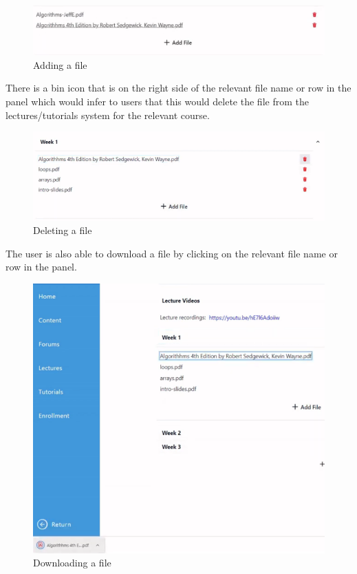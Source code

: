 \begin{figure}[h!]
    \includegraphics[scale=0.3]{images/lat-add-file.png}
    \centering
    \caption{Adding a file}
\end{figure}

There is a bin icon that is on the right side of the relevant file name or row in the panel which would infer to users that this would delete the file from the lectures/tutorials system for the relevant course.

\begin{figure}[h!]
    \includegraphics[scale=0.3]{images/lat-delete-file.png}
    \centering
    \caption{Deleting a file}
\end{figure}

The user is also able to download a file by clicking on the relevant file name or row in the panel.

\begin{figure}[h!]
    \includegraphics[scale=0.3]{images/lat-download-file.png}
    \centering
    \caption{Downloading a file}
\end{figure}

